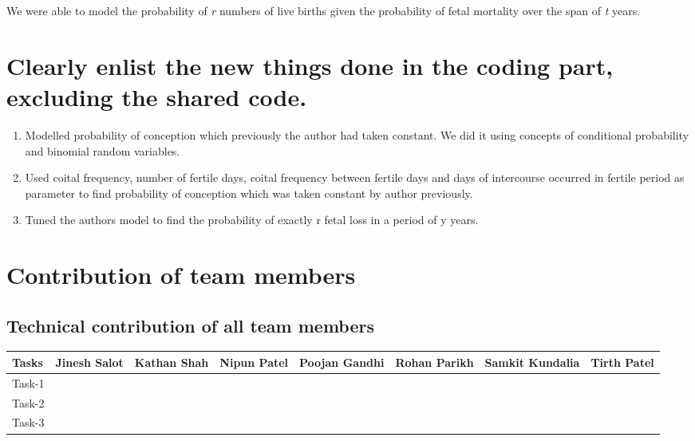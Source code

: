 \documentclass{article}
\begin{document}

We were able to model the probability of {\itshape r} numbers of live births given the probability of fetal mortality over the span of {\itshape t} years.


\section{Clearly enlist the new things done in the coding part, excluding the shared code.}

\begin{enumerate}
    \item Modelled probability of conception which previously the author had taken constant. We did it using concepts of conditional probability and binomial random variables.
    \item Used coital frequency, number of fertile days, coital frequency between fertile days and days of intercourse occurred in fertile period as parameter to find probability of conception which was taken constant by author previously.
    \item Tuned the authors model to find the probability of exactly r fetal loss in a period of y years.
\end{enumerate}


\section{Contribution of team members}	
\subsection{Technical contribution of all team members }
\begin{table}[h]
\centering
\begin{tabular}{|p{3.8154cm}|p{1.4154cm}|p{1.4154cm}|p{1.4154cm}|p{1.4154cm}|p{1.4154cm}|p{1.4154cm}|p{1.4154cm}|}
\hline
Tasks  & Jinesh Salot & Kathan Shah & Nipun Patel & Poojan Gandhi & Rohan Parikh & Samkit Kundalia & Tirth Patel \\ \hline
Task-1 &      &       &        &          &     &       &         \\ \hline
Task-2 &      &       &        &          &     &       &         \\ \hline
Task-3 &      &       &        &          &     &       &       \\ \hline
\end{tabular}
\end{table}
\end{document}
